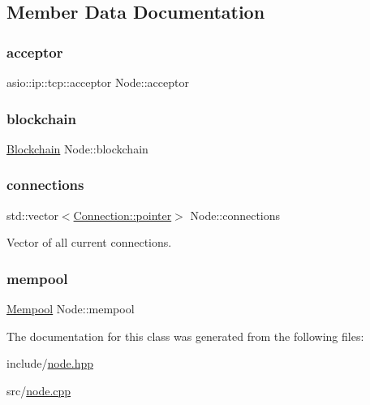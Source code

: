 \subsection{Member Data Documentation}
\mbox{\label{classNode_a3b0f7b49f99b1aad5ffeffb5b721b7a0}} 
\subsubsection{\texorpdfstring{acceptor}{acceptor}}
{\footnotesize\ttfamily asio\+::ip\+::tcp\+::acceptor Node\+::acceptor\hspace{0.3cm}{\ttfamily [private]}}

\mbox{\label{classNode_a631d922988b25901cb0e98a5274c2588}} 
\subsubsection{\texorpdfstring{blockchain}{blockchain}}
{\footnotesize\ttfamily \mbox{\hyperlink{classBlockchain}{Blockchain}} Node\+::blockchain\hspace{0.3cm}{\ttfamily [private]}}

\mbox{\label{classNode_ab9ba07b806d024e8461fae70bea349c0}} 
\subsubsection{\texorpdfstring{connections}{connections}}
{\footnotesize\ttfamily std\+::vector$<$\mbox{\hyperlink{classConnection_a1bb6cd8924ff091e9b053e3368735c9c}{Connection\+::pointer}}$>$ Node\+::connections\hspace{0.3cm}{\ttfamily [private]}}



Vector of all current connections. 

\mbox{\label{classNode_a2c3b3df5c2c8f4b7e95e1aa3dfd80e25}} 
\subsubsection{\texorpdfstring{mempool}{mempool}}
{\footnotesize\ttfamily \mbox{\hyperlink{classMempool}{Mempool}} Node\+::mempool\hspace{0.3cm}{\ttfamily [private]}}



The documentation for this class was generated from the following files\+:\begin{DoxyCompactItemize}
\item 
include/\mbox{\hyperlink{node_8hpp}{node.\+hpp}}\item 
src/\mbox{\hyperlink{node_8cpp}{node.\+cpp}}\end{DoxyCompactItemize}
